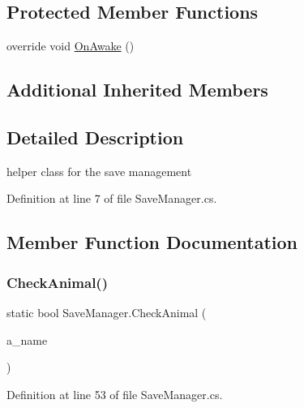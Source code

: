 \subsection*{Protected Member Functions}
\begin{DoxyCompactItemize}
\item 
override void \mbox{\hyperlink{class_save_manager_a74ded72b7bc7c81cc87722a84518ebcf}{On\+Awake}} ()
\end{DoxyCompactItemize}
\subsection*{Additional Inherited Members}


\subsection{Detailed Description}
helper class for the save management 



Definition at line 7 of file Save\+Manager.\+cs.



\subsection{Member Function Documentation}
\mbox{\label{class_save_manager_a80374b27895fccd7ff7da0e3bff27e60}} 
\subsubsection{\texorpdfstring{Check\+Animal()}{CheckAnimal()}}
{\footnotesize\ttfamily static bool Save\+Manager.\+Check\+Animal (\begin{DoxyParamCaption}\item[{\mbox{\hyperlink{_animal_8cs_a2fa5713399b84d1b88dae9196837af50}{A\+N\+I\+M\+A\+L\+\_\+\+N\+A\+ME}}}]{a\+\_\+name }\end{DoxyParamCaption})\hspace{0.3cm}{\ttfamily [static]}}



Definition at line 53 of file Save\+Manager.\+cs.

\mbox{\label{class_save_manager_a50508f281944398c5721197654ff9b3e}} 
